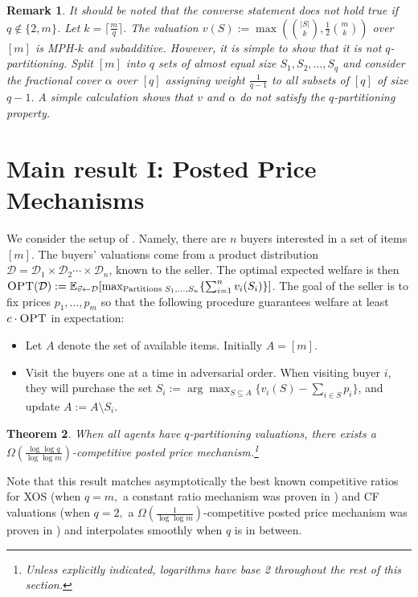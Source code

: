 \documentclass[11pt]{article}\usepackage{amsfonts}
\newtheorem{theorem}{Theorem}
\newtheorem{remark}[theorem]{Remark}
\numberwithin{theorem}{subsection}
\begin{document}
\begin{remark}
\normalfont
It should be noted that the converse statement does not hold true if $q\not \in \{2,m\}$. Let $k = \lceil \frac{m}{q}\rceil.$ The valuation $v(S):= \max\left( \binom{|S|}{k}, \frac{1}{2}\binom{m}{k}\right)$ over $[m]$ is MPH-$k$ and subadditive. However, it is simple to show that it is not $q$-partitioning. Split $[m]$ into $q$ sets of almost equal size $S_1, S_2, \ldots, S_q$ and consider the fractional cover $\alpha$ over $[q]$ assigning weight $\frac{1}{q-1}$ to all subsets of $[q]$ of size $q-1.$ A simple calculation shows that $v$ and $\alpha$ do not satisfy the $q$-partitioning property.
\end{remark}

\section{Main result I: Posted Price Mechanisms}\label{section:postedprices}
We consider the setup of \cite{FeldmanGL15}. Namely, there are $n$ buyers interested in a set of items $[m].$ The buyers' valuations come from a product distribution $\mathcal{D} = \mathcal{D}_1\times \mathcal{D}_2\cdots\times\mathcal{D}_n$, known to the seller. The optimal expected welfare is then $\textsc{OPT}(\mathcal{D}):=\mathbb{E}_{\vec{v} \leftarrow \mathcal{D}}[\max_{\text{Partitions } S_1,\ldots, S_n}\{\sum_{i=1}^n v_i(S_i)\}]$. The goal of the seller is to fix prices $p_1,\ldots, p_m$ so that the following procedure guarantees welfare at least $c\cdot \textsc{OPT}$ in expectation:
\begin{itemize}
\item Let $A$ denote the set of available items. Initially $A = [m]$.
\item Visit the buyers one at a time in adversarial order. When visiting buyer $i$, they will purchase the set $S_i:=\arg\max_{S \subseteq A}\{v_i(S) - \sum_{i \in S} p_i\}$, and update $A:=A \setminus S_i$. 
\end{itemize}

\begin{theorem}
\label{thm:postedpriceqpart}
    When all agents have $q$-partitioning valuations, there exists a
    $\Omega(\frac{\log \log q}{\log \log m})$-competitive
    posted price mechanism.\footnote{Unless explicitly indicated, logarithms have base 2 throughout the rest of this section.}
\end{theorem}

Note that this result matches asymptotically the best known competitive ratios for XOS (when $q = m,$ a constant ratio mechanism was proven in \cite{FeldmanGL15}) and CF valuations (when $q = 2,$ a $\Omega(\frac{1}{\log \log m})$-competitive posted price mechanism was proven in \cite{DuttingKL20}) and interpolates smoothly when $q$ is in between.
\end{document}
